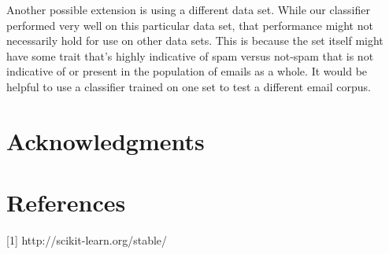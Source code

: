 \documentclass{article} %
\begin{document}
Another possible extension is using a different data set. While our classifier performed very well on this particular data set, that performance might not necessarily hold for use on other data sets. This is because the set itself might have some trait that's highly indicative of spam versus not-spam that is not indicative of or present in the population of emails as a whole. It would be helpful to use a classifier trained on one set to test a different email corpus. 

\section{Acknowledgments}

\section{References}

[1] http://scikit-learn.org/stable/
\end{document}
